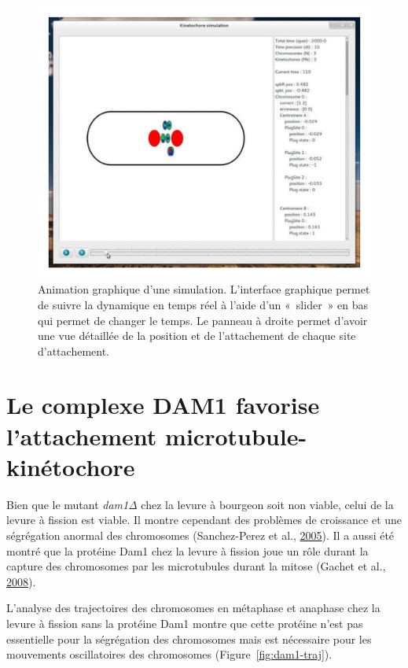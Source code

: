 \documentclass[12pt,a4paper,twoside,openright]{book}
\begin{document}
\begin{figure}[htbp]
\centering
\includegraphics{figures/annexes/gui.png}
\caption[Animation graphique d'une simulation]{\label{fig:kt-simul-gui}Animation
graphique d'une simulation. L'interface graphique permet de suivre la
dynamique en temps réel à l'aide d'un «~slider~» en bas qui permet de
changer le temps. Le panneau à droite permet d'avoir une vue détaillée
de la position et de l'attachement de chaque site d'attachement.}
\end{figure}

\cleardoublepage
\clearpage\null

\section{Le complexe DAM1 favorise l'attachement
microtubule-kinétochore}\label{le-complexe-dam1-favorise-lattachement-microtubule-kinuxe9tochore}

\label{sec:dam1}

Bien que le mutant \emph{dam1Δ} chez la levure à bourgeon soit non
viable, celui de la levure à fission est viable. Il montre cependant des
problèmes de croissance et une ségrégation anormal des chromosomes
(Sanchez-Perez et al., \protect\hyperlink{ref-Sanchez-Perez2005}{2005}).
Il a aussi été montré que la protéine Dam1 chez la levure à fission joue
un rôle durant la capture des chromosomes par les microtubules durant la
mitose (Gachet et al., \protect\hyperlink{ref-Gachet2008a}{2008}).

L'analyse des trajectoires des chromosomes en métaphase et anaphase chez
la levure à fission sans la protéine Dam1 montre que cette protéine
n'est pas essentielle pour la ségrégation des chromosomes mais est
nécessaire pour les mouvements oscillatoires des chromosomes
(Figure~\ref{fig:dam1-traj}).
\end{document}
